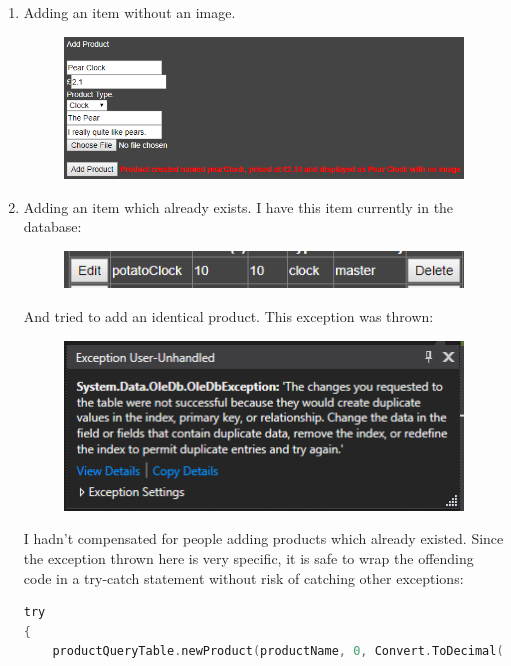 ﻿\documentclass{article}
\begin{document}
\begin{enumerate}
\begin{figure}[H]
            \centering
        \end{figure}
        \item Adding an item without an image.
        \begin{figure}[H]
            \includegraphics{testing/productManagement3.png}
            \centering
        \end{figure}
        \item Adding an item which already exists.
        I have this item currently in the database:
        \begin{figure}[H]
            \includegraphics{testing/productManagement4.png}
            \centering
        \end{figure}
        And tried to add an identical product.
        This exception was thrown:
        \begin{figure}[H]
            \includegraphics{testing/productManagement5.png}
            \centering
        \end{figure}
        I hadn't compensated for people adding products which already existed.
        Since the exception thrown here is very specific, it is safe to wrap the offending code in a try-catch statement without risk of catching other exceptions:
        \begin{lstlisting}[language=C]
try
{
    productQueryTable.newProduct(productName, 0, Convert.ToDecimal(price), displayName, typeDropdown.SelectedValue, Convert.ToString(Session["currentUser"]), imagePath, bandBox.Text, descriptionBox.Text);

\end{lstlisting}
\end{enumerate}
\end{document}
